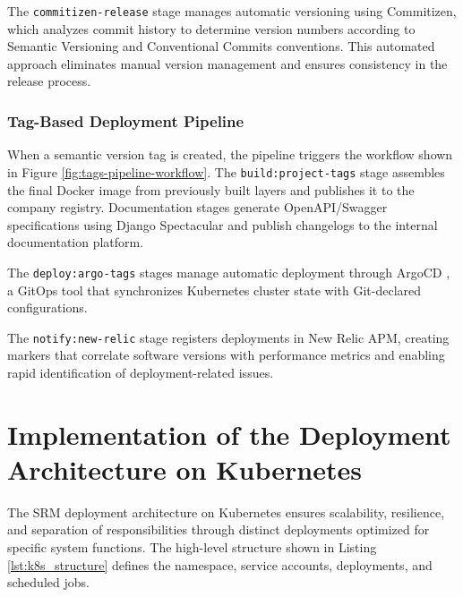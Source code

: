 The \texttt{commitizen-release} stage manages automatic versioning using Commitizen, which analyzes commit history to determine version numbers according to Semantic Versioning and Conventional Commits conventions. This automated approach eliminates manual version management and ensures consistency in the release process.

\subsubsection{Tag-Based Deployment Pipeline}

When a semantic version tag is created, the pipeline triggers the workflow shown in Figure \ref{fig:tags-pipeline-workflow}. The \texttt{build:project-tags} stage assembles the final Docker image from previously built layers and publishes it to the company registry. Documentation stages generate OpenAPI/Swagger specifications using Django Spectacular and publish changelogs to the internal documentation platform.

The \texttt{deploy:argo-tags} stages manage automatic deployment through ArgoCD \cite{argocd}, a GitOps tool that synchronizes Kubernetes cluster state with Git-declared configurations. %


The \texttt{notify:new-relic} stage registers deployments in New Relic APM, creating markers that correlate software versions with performance metrics and enabling rapid identification of deployment-related issues.

\section{Implementation of the Deployment Architecture on Kubernetes}

The SRM deployment architecture on Kubernetes ensures scalability, resilience, and separation of responsibilities through distinct deployments optimized for specific system functions. The high-level structure shown in Listing \ref{lst:k8s_structure} defines the namespace, service accounts, deployments, and scheduled jobs.


